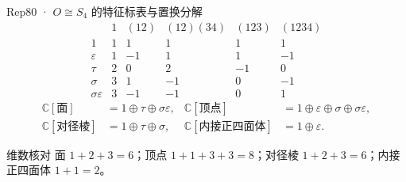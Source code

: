 \documentclass[aspectratio=169,10pt,fontset=none]{ctexbeamer}
\begin{document}
\begin{frame}[t]{Rep80 · $O\cong S_4$ 的特征标表与置换分解}
  \[
    \begin{array}{c|rrrrr}
                 & 1 & (12) & (12)(34) & (123) & (1234) \\ \hline
      1          & 1 & 1  & 1  & 1  & 1  \\
      \varepsilon& 1 & -1 & 1  & 1  & -1 \\
      \tau       & 2 & 0  & 2  & -1 & 0  \\
      \sigma     & 3 & 1  & -1 & 0  & -1 \\
      \sigma\varepsilon & 3 & -1 & -1 & 0 & 1
    \end{array}
  \]
  \vspace{-0.4em}
  \begin{align*}
    \mathbb{C}[\text{面}]           &= 1\oplus\tau\oplus\sigma\varepsilon, &
    \mathbb{C}[\text{顶点}]         &= 1\oplus\varepsilon\oplus\sigma\oplus\sigma\varepsilon,\\
    \mathbb{C}[\text{对径棱}]       &= 1\oplus\tau\oplus\sigma, &
    \mathbb{C}[\text{内接正四面体}] &= 1\oplus\varepsilon.
  \end{align*}
  \begin{exampleblock}{维数核对}
    面 $1+2+3=6$；顶点 $1+1+3+3=8$；对径棱 $1+2+3=6$；内接正四面体 $1+1=2$。
  \end{exampleblock}
\end{frame}
\end{document}
